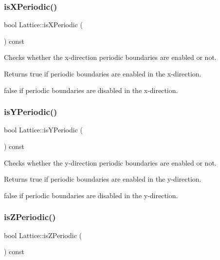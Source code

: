 \subsubsection{\texorpdfstring{is\+X\+Periodic()}{isXPeriodic()}}
{\footnotesize\ttfamily bool Lattice\+::is\+X\+Periodic (\begin{DoxyParamCaption}{ }\end{DoxyParamCaption}) const}



Checks whether the x-\/direction periodic boundaries are enabled or not. 

\begin{DoxyReturn}{Returns}
true if periodic boundaries are enabled in the x-\/direction. 

false if periodic boundaries are disabled in the x-\/direction. 
\end{DoxyReturn}
\mbox{\label{class_lattice_ac3192acefb019c5258143a6c758b3e48}} 
\subsubsection{\texorpdfstring{is\+Y\+Periodic()}{isYPeriodic()}}
{\footnotesize\ttfamily bool Lattice\+::is\+Y\+Periodic (\begin{DoxyParamCaption}{ }\end{DoxyParamCaption}) const}



Checks whether the y-\/direction periodic boundaries are enabled or not. 

\begin{DoxyReturn}{Returns}
true if periodic boundaries are enabled in the y-\/direction. 

false if periodic boundaries are disabled in the y-\/direction. 
\end{DoxyReturn}
\mbox{\label{class_lattice_ad7dd1b12a253e506aba5cedb57bf86ea}} 
\subsubsection{\texorpdfstring{is\+Z\+Periodic()}{isZPeriodic()}}
{\footnotesize\ttfamily bool Lattice\+::is\+Z\+Periodic (\begin{DoxyParamCaption}{ }\end{DoxyParamCaption}) const}



